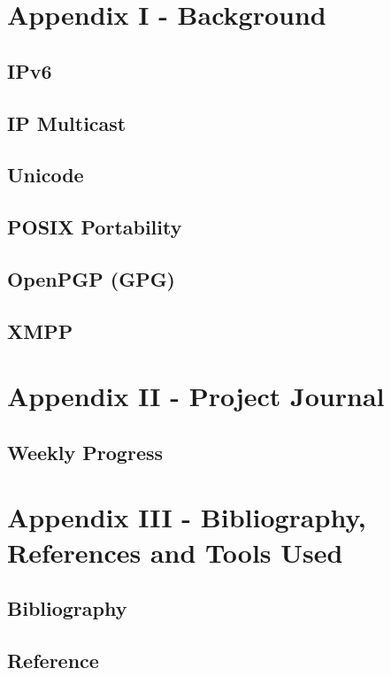\documentclass[a4paper,12pt]{book}
\begin{document}
\chapter{Appendix I - Background}

\section{IPv6}

\section{IP Multicast}

\section{Unicode}

\section{POSIX Portability}

\section{OpenPGP (GPG)}

\section{XMPP}


\chapter{Appendix II - Project Journal}

\section{Weekly Progress}


\chapter{Appendix III - Bibliography, References and Tools Used}

\section{Bibliography}

\section{Reference}
\end{document}
